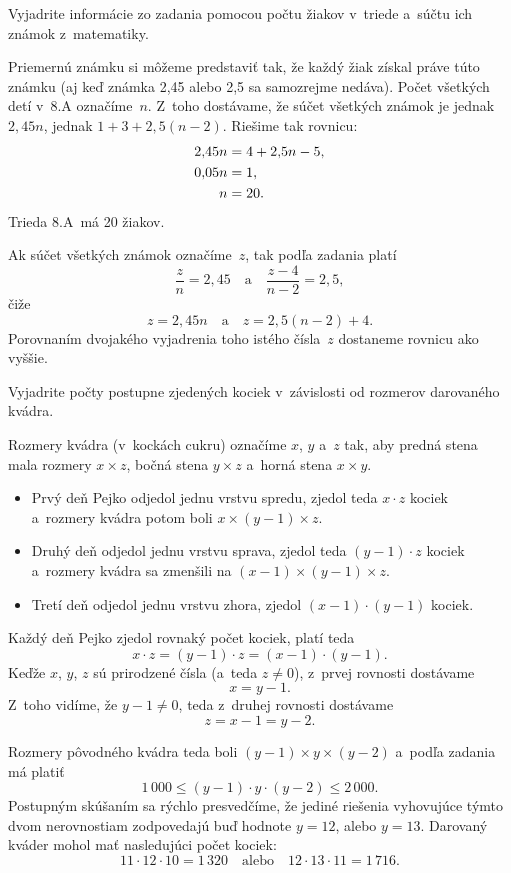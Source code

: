 {%
\napad
Vyjadrite informácie zo zadania pomocou počtu žiakov v~triede a~súčtu
ich známok z~matematiky.

\riesenie
Priemernú známku si môžeme predstaviť tak, že každý žiak získal práve túto známku
(aj keď známka 2{,}45 alebo 2{,}5 sa samozrejme nedáva).
Počet všetkých detí v~8.A označíme~$n$.
Z~toho dostávame, že súčet všetkých známok je jednak $2{,}45n$,
jednak $1+3+2{,}5(n-2)$.
Riešime tak rovnicu:
$$
\aligned
2{,}45n&=4+2{,}5n-5,\\
0{,}05n&=1,\\
n&=20.
\endaligned
$$
Trieda 8.A~má 20 žiakov.

\poznamka
Ak súčet všetkých známok označíme~$z$, tak podľa zadania platí
$$
\frac{z}n=2{,}45
\quad\text{a}\quad
\frac{z-4}{n-2}=2{,}5,
$$
čiže
$$
z=2{,}45n
\quad\text{a}\quad
z=2{,}5(n-2)+4.
$$
Porovnaním dvojakého vyjadrenia toho istého čísla~$z$ dostaneme rovnicu ako vyššie.
}

{%
\napad
Vyjadrite počty postupne zjedených kociek v~závislosti od rozmerov darovaného
kvádra.

\riesenie
Rozmery kvádra (v~kockách cukru) označíme $x$, $y$ a~$z$ tak, aby predná
stena mala rozmery $x\times z$, bočná stena $y\times z$ a~horná stena
$x\times y$.

\begin{itemize}
\item Prvý deň Pejko odjedol jednu vrstvu spredu, zjedol teda $x\cdot z$ kociek a~rozmery kvádra potom boli $x\times(y-1)\times z$.
\item Druhý deň odjedol jednu vrstvu sprava, zjedol teda $(y-1)\cdot z$ kociek a~rozmery kvádra sa
zmenšili na $(x-1)\times(y-1)\times z$.
\item Tretí deň odjedol jednu vrstvu zhora, zjedol $(x-1)\cdot(y-1)$ kociek.
\end{itemize}

Každý deň Pejko zjedol rovnaký počet kociek, platí teda
$$
x\cdot z=(y-1)\cdot z=(x-1)\cdot(y-1).
$$
Keďže $x$, $y$, $z$ sú prirodzené čísla (a~teda $z\ne0$),
z~prvej rovnosti dostávame
$$
x=y-1.
$$
Z~toho vidíme, že $y-1\ne0$, teda z~druhej rovnosti dostávame
$$
z=x-1=y-2.
$$

Rozmery pôvodného kvádra teda boli $(y-1)\times y\times(y-2)$ a~podľa zadania
má platiť
$$
1\,000\le(y-1)\cdot y\cdot(y-2)\le2\,000.
$$
Postupným skúšaním sa rýchlo presvedčíme, že jediné riešenia vyhovujúce
týmto dvom nerovnostiam zodpovedajú buď hodnote $y=12$, alebo $y=13$.
Darovaný kváder mohol mať nasledujúci počet kociek:
$$
11\cdot12\cdot10=1\,320
\quad\text{alebo}\quad
12\cdot13\cdot11=1\,716.
$$
}

